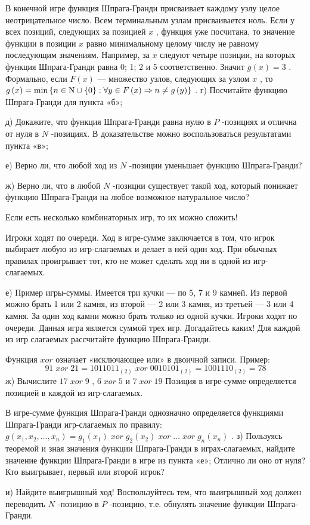 \begin{problem}
В конечной игре функция Шпрага-Гранди присваивает каждому узлу целое неотрицательное число.
Всем терминальным узлам присваивается ноль.
Если у всех позиций, следующих за позицией  $x$ , функция уже посчитана, то значение функции в позиции  $x$  равно минимальному целому числу не равному последующим значениям.
Например, за  $x$  следуют четыре позиции, на которых функция Шпрага-Гранди равна 0; 1; 2 и 5 соответственно. Значит  $g\left(x\right)=3$ . Формально, если  $F\left(x\right)$  — множество узлов, следующих за узлом  $x$ , то  $g\left(x\right)=\min \left\{n\in {\rm N} \cup \left\{0\right\}:\forall y\in F\left(x\right)\Rightarrow n\ne g\left(y\right)\right\}$ .
г)	Посчитайте функцию Шпрага-Гранди для пункта «б»;\par
д)	Докажите, что функция Шпрага-Гранди равна нулю в  $P$ -позициях и отлична от нуля в  $N$ -позициях. В доказательстве можно воспользоваться результатами пункта «в»;\par
е)	Верно ли, что любой ход из  $N$ -позиции уменьшает функцию Шпрага-Гранди?\par
ж)	Верно ли, что в любой  $N$ -позиции существует такой ход, который понижает функцию Шпрага-Гранди на любое возможное натуральное число?\par
Если есть несколько комбинаторных игр, то их можно сложить! \par
Игроки ходят по очереди. Ход в игре-сумме заключается в том, что игрок выбирает любую из игр-слагаемых и делает в ней один ход. При обычных правилах проигрывает тот, кто не может сделать ход ни в одной из игр-слагаемых.\par
е)	Пример игры-суммы. Имеется три кучки — по 5, 7 и 9 камней. Из первой можно брать 1 или 2 камня, из второй — 2 или 3 камня, из третьей — 3 или 4 камня. За один ход камни можно брать только из одной кучки. Игроки ходят по очереди. Данная игра является суммой трех игр. Догадайтесь каких! Для каждой из игр слагаемых рассчитайте функцию Шпрага-Гранди.\par
Функция  $xor$  означает «исключающее или» в двоичной записи. Пример:
\[91\; xor\; 21=1011011_{\left(2\right)} \; xor\; 0010101_{\left(2\right)} =1001110_{\left(2\right)} =78\]
ж)	Вычислите  $17\; xor\; 9$ ,  $6\; xor\; 5$  и  $7\; xor\; 19$
Позиция в игре-сумме определяется позицией в каждой из игр-слагаемых.\par
{}
В игре-сумме функция Шпрага-Гранди однозначно определяется функциями Шпрага-Гранди игр-слагаемых по правилу:  $g\left(x_{1} ,x_{2} ,\ldots ,x_{n} \right)=g_{1} \left(x_{1} \right)\; xor\; g_{2} \left(x_{2} \right)\; xor\; \ldots \; xor\; g_{n} \left(x_{n} \right)$ .
з)	Пользуясь теоремой и зная значения функции Шпрага-Гранди в играх-слагаемых, найдите значение функции Шпрага-Гранди в игре из пункта «е»; Отлично ли оно от нуля? Кто выигрывает, первый или второй игрок?\par
и)	Найдите выигрышный ход! Воспользуйтесь тем, что выигрышный ход должен переводить  $N$ -позицию в  $P$ -позицию, т.е. обнулять значение функции Шпрага-Гранди.




\end{problem}
